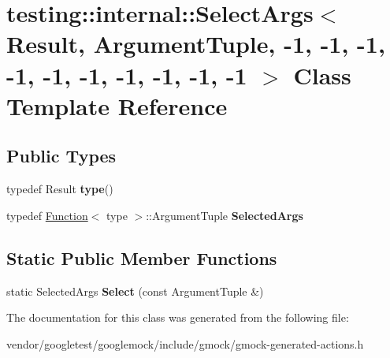 \hypertarget{classtesting_1_1internal_1_1_select_args_3_01_result_00_01_argument_tuple_00_01-1_00_01-1_00_01-99299a766a33bd3110e39f51f43b194a}{}\section{testing\+:\+:internal\+:\+:Select\+Args$<$ Result, Argument\+Tuple, -\/1, -\/1, -\/1, -\/1, -\/1, -\/1, -\/1, -\/1, -\/1, -\/1 $>$ Class Template Reference}
\label{classtesting_1_1internal_1_1_select_args_3_01_result_00_01_argument_tuple_00_01-1_00_01-1_00_01-99299a766a33bd3110e39f51f43b194a}
\subsection*{Public Types}
\begin{DoxyCompactItemize}
\item 
\mbox{\label{classtesting_1_1internal_1_1_select_args_3_01_result_00_01_argument_tuple_00_01-1_00_01-1_00_01-99299a766a33bd3110e39f51f43b194a_a1630336a54c2407c1046bd1158a19569}} 
typedef Result {\bfseries type}()
\item 
\mbox{\label{classtesting_1_1internal_1_1_select_args_3_01_result_00_01_argument_tuple_00_01-1_00_01-1_00_01-99299a766a33bd3110e39f51f43b194a_a51990aecfbd69bd557cabd6798fae384}} 
typedef \hyperlink{structtesting_1_1internal_1_1_function}{Function}$<$ type $>$\+::Argument\+Tuple {\bfseries Selected\+Args}
\end{DoxyCompactItemize}
\subsection*{Static Public Member Functions}
\begin{DoxyCompactItemize}
\item 
\mbox{\label{classtesting_1_1internal_1_1_select_args_3_01_result_00_01_argument_tuple_00_01-1_00_01-1_00_01-99299a766a33bd3110e39f51f43b194a_a3006d06399412a67f576dca100f3a830}} 
static Selected\+Args {\bfseries Select} (const Argument\+Tuple \&)
\end{DoxyCompactItemize}


The documentation for this class was generated from the following file\+:\begin{DoxyCompactItemize}
\item 
vendor/googletest/googlemock/include/gmock/gmock-\/generated-\/actions.\+h\end{DoxyCompactItemize}
